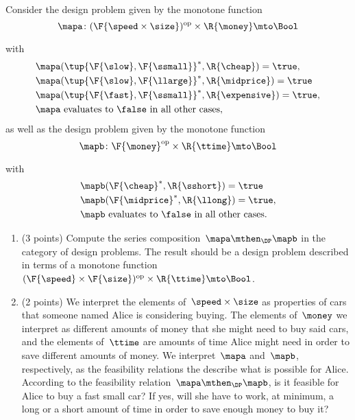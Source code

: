 \documentclass[paper=8.125in:10.250in,pagesize=pdftex,
    headinclude=false,footinclude=false,oneside,egregdoesnotlikesansseriftitles]{kaobook}
\begin{document}
\begin{gradedexercise}
Consider the design problem given by the monotone function 
\begin{equation}
\mapa\colon (\F{\speed \times \size})^{\text{op}} \times \R{\money} \mto \Bool
\end{equation}
\begin{center}
\end{center}
with 
\begin{align*}
&\mapa(\tup{ \F{\slow}, \F{\ssmall}}^*, \R{\cheap}) = \true, \\
&\mapa(\tup{ \F{\slow}, \F{\llarge}}^*, \R{\midprice}) = \true \\
&\mapa(\tup{ \F{\fast}, \F{\ssmall}}^*, \R{\expensive}) =  \true, \\
&\mapa \text{ evaluates to } \false \text{ in all other cases},
\end{align*}
as well as the design problem given by the monotone function 
\begin{equation}
\mapb\colon \F{\money}^{\text{op}} \times \R{\ttime} \mto \Bool
\end{equation}
\begin{center}
\end{center}
with 
\begin{align*}
&\mapb( \F{\cheap}^*, \R{\sshort}) = \true \\
&\mapb(\F{\midprice}^*, \R{\llong}) = \true, \\
&\mapb \text{ evaluates to } \false \text{ in all other cases}.
\end{align*}

\begin{enumerate} 
\item (3 points) Compute the series composition~$\mapa \mthen_\DP \mapb$ in the category of design problems.
The result should be a design problem described in terms of a monotone function~$(\F{\speed} \times \F{\size})^{\text{op}} \times \R{\ttime} \mto \Bool$.
\item (2 points) We interpret the elements of~$\speed \times \size$ as properties of cars that someone named Alice is considering buying.
The elements of~$\money$ we interpret as different amounts of money that she might need to buy said cars, and the elements of~$\ttime$ are amounts of time Alice might need in order to save different amounts of money.
We interpret~$\mapa$ and~$\mapb$, respectively, as the feasibility relations the describe what is possible for Alice.
According to the feasibility relation~$\mapa \mthen_\DP \mapb$, is it feasible for Alice to buy a fast small car?
If yes, will she have to work, at minimum, a long or a short amount of time in order to save enough money to buy it?
\end{enumerate}
\end{gradedexercise}
\end{document}

